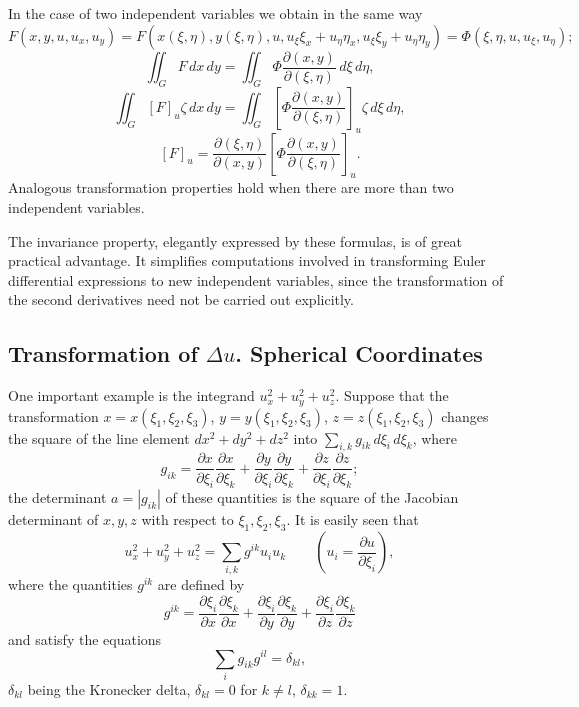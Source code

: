 In the case of two independent variables we obtain in the same way
\[
F(x,y,u,u_x,u_y)=F(x(\xi,\eta),y(\xi,\eta),u,u_\xi\xi_x+u_\eta\eta_x,u_\xi\xi_y+u_\eta\eta_y)
=\Phi(\xi,\eta,u,u_\xi,u_\eta);
\]
\[
\iint_G F\,dx\,dy=\iint_G\Phi\frac{\partial(x,y)}{\partial(\xi,\eta)}\,d\xi\,d\eta,
\]
\[
\iint_G[F]_u\zeta\,dx\,dy=\iint_G\left[\Phi\frac{\partial(x,y)}{\partial(\xi,\eta)}\right]_u\zeta\,d\xi\,d\eta,
\]
\begin{equation}\tag{60}
[F]_u=\frac{\partial(\xi,\eta)}{\partial(x,y)}\left[\Phi\frac{\partial(x,y)}{\partial(\xi,\eta)}\right]_u.
\end{equation}
Analogous transformation properties hold when there are more than two independent variables.

The invariance property, elegantly expressed by these formulas, is of great practical advantage. It simplifies computations involved in transforming Euler differential expressions to new independent variables, since the transformation of the second derivatives need not be carried out explicitly.

\subsection{Transformation of $\Delta u$. Spherical Coordinates}
One important example is the integrand $u_x^2+u_y^2+u_z^2$. Suppose that the transformation $x=x(\xi_1,\xi_2,\xi_3)$, $y=y(\xi_1,\xi_2,\xi_3)$, $z=z(\xi_1,\xi_2,\xi_3)$ changes the square of the line element $dx^2+dy^2+dz^2$ into $\sum_{i,k}g_{ik}\,d\xi_i\,d\xi_k$, where
\[
g_{ik}=\frac{\partial x}{\partial\xi_i}\frac{\partial x}{\partial\xi_k}
+\frac{\partial y}{\partial\xi_i}\frac{\partial y}{\partial\xi_k}
+\frac{\partial z}{\partial\xi_i}\frac{\partial z}{\partial\xi_k};
\]
the determinant $a=|g_{ik}|$ of these quantities is the square of the Jacobian determinant of $x,y,z$ with respect to $\xi_1,\xi_2,\xi_3$. It is easily seen that
\[
u_x^2+u_y^2+u_z^2=\sum_{i,k}g^{ik}u_i u_k\qquad\left(u_i=\frac{\partial u}{\partial\xi_i}\right),
\]
where the quantities $g^{ik}$ are defined by
\[
g^{ik}=\frac{\partial\xi_i}{\partial x}\frac{\partial\xi_k}{\partial x}
+\frac{\partial\xi_i}{\partial y}\frac{\partial\xi_k}{\partial y}
+\frac{\partial\xi_i}{\partial z}\frac{\partial\xi_k}{\partial z}
\]
and satisfy the equations
\[
\sum_i g_{ik}g^{il}=\delta_{kl},
\]
$\delta_{kl}$ being the Kronecker delta, $\delta_{kl}=0$ for $k\ne l$, $\delta_{kk}=1$.


